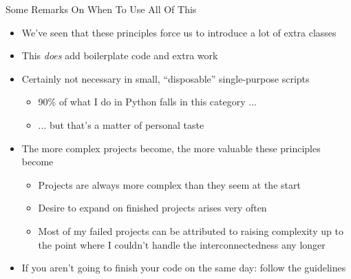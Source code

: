 \begin{frame}{Some Remarks On When To Use All Of This}
%
\begin{itemize}
\item We've seen that these principles force us to introduce a lot of extra classes
\item This \emph{does} add boilerplate code and extra work
\item Certainly not necessary in small, \enquote{disposable} single-purpose scripts
	\begin{itemize}
	\item 90\% of what I do in Python falls in this category ...
	\item ... but that's a matter of personal taste
	\end{itemize}
\pause
\item The more complex projects become, the more valuable these principles become
	\begin{itemize}
	\item Projects are always more complex than they seem at the start
	\item Desire to expand on finished projects arises very often
	\item Most of my failed projects can be attributed to raising complexity up to the point where I couldn't handle the interconnectedness any longer
	\end{itemize}
\pause
\item[\Thus] If you aren't going to finish your code on the same day: follow the guidelines
\end{itemize}
%
\end{frame}

